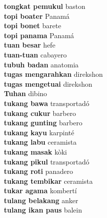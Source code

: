 \textbf{ tongkat pemukul  } baston \\
\textbf{ topi boater  } Panamá \\
\textbf{ topi bonet  } barete \\
\textbf{ topi panama  } Panamá \\
\textbf{ tuan besar  } hefe \\
\textbf{ tuan-tuan  } cabayero \\
\textbf{ tubuh badan  } anatomia \\
\textbf{ tugas mengarahkan  } direkshon \\
\textbf{ tugas mengetuai  } direkshon \\
\textbf{ Tuhan  } dibino \\
\textbf{ tukang bawa  } transportadó \\
\textbf{ tukang cukur  } barbero \\
\textbf{ tukang gunting  } barbero \\
\textbf{ tukang kayu  } karpinté \\
\textbf{ tukang labu  } ceramista \\
\textbf{ tukang masak  } kòki \\
\textbf{ tukang pikul  } transportadó \\
\textbf{ tukang roti  } panadero \\
\textbf{ tukang tembikar  } ceramista \\
\textbf{ tukar agama  } kombertí \\
\textbf{ tulang belakang  } anker \\
\textbf{ tulang ikan paus  } balein \\
